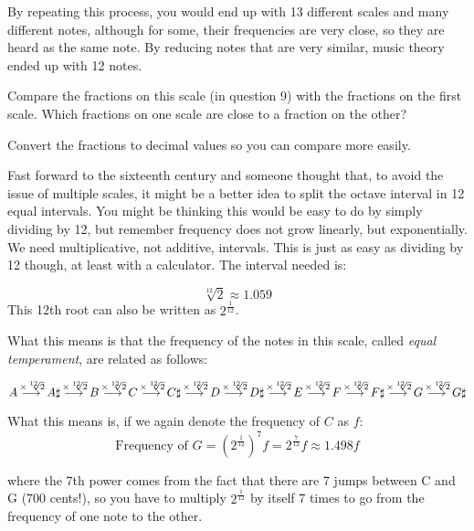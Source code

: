 \documentclass[12pt,noauthor,nooutcomes,hints,instructornotes]{ximera}%
\begin{document}
By repeating this process, you would end up with 13 different scales and many different notes, although for some, their frequencies are very close, so they are heard as the same note. By reducing notes that are very similar, music theory ended up with 12 notes.


\begin{question} Compare the fractions on this scale (in question 9) with the fractions on the first scale. Which fractions on one scale are close to a fraction on the other?
\begin{hint}
Convert the fractions to decimal values so you can compare more easily.
\end{hint}
\end{question} 

Fast forward to the sixteenth century and someone thought that, to avoid the issue of multiple scales, it might be a better idea to split the octave interval in 12 equal intervals. You might be thinking this would be easy to do by simply dividing by 12, but remember frequency does not grow linearly, but exponentially. We need multiplicative, not additive, intervals. This is just as easy as dividing by 12 though, at least with a calculator. The interval needed is:

\[\sqrt[12]{2}\approx1.059
\]
This 12th root can also be written as $2^{\frac{1}{12}}$.

What this means is that the frequency of the notes in this scale, called \textit{equal temperament}, are related as follows:

\[
A \mathop{\longrightarrow\,}\limits^{\times\sqrt[12]{2}} A\sharp \mathop{\longrightarrow\,}\limits^{\times\sqrt[12]{2}} B \mathop{\longrightarrow\,}\limits^{\times\sqrt[12]{2}} C \mathop{\longrightarrow\,}\limits^{\times\sqrt[12]{2}} C\sharp \mathop{\longrightarrow\,}\limits^{\times\sqrt[12]{2}} D \mathop{\longrightarrow\,}\limits^{\times\sqrt[12]{2}} D\sharp 
\mathop{\longrightarrow\,}\limits^{\times\sqrt[12]{2}} E
\mathop{\longrightarrow\,}\limits^{\times\sqrt[12]{2}} F
\mathop{\longrightarrow\,}\limits^{\times\sqrt[12]{2}} F\sharp
\mathop{\longrightarrow\,}\limits^{\times\sqrt[12]{2}} G
\mathop{\longrightarrow\,}\limits^{\times\sqrt[12]{2}} G\sharp
\]

What this means is, if we again denote the frequency of $C$ as $f$:
\[
\text{Frequency of } G =\left(2^{\frac{1}{12}}\right)^7f=2^\frac{7}{12}f\approx 1.498f
\]

where the 7th power comes from the fact that there are 7 jumps between C and G (700 cents!), so you have to multiply $2^{\frac{1}{12}}$ by itself 7 times to go from the frequency of one note to the other.
\end{document}
